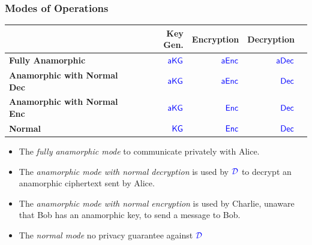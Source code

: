 \documentclass[]{beamer}
\newcommand{\calD}{\mathcal{D}}    %
\newcommand{\algofont}[1]{{\mathsf{#1}}}
\newcommand{\kg}{\algofont{KG}}
\newcommand{\enc}{\algofont{Enc}}
\newcommand{\dec}{\algofont{Dec}}
\newcommand{\akg}{\algofont{a}\kg}
\newcommand{\aenc}{\algofont{a}\enc}
\newcommand{\adec}{\algofont{a}\dec}
\begin{document}
\begin{frame}
\frametitle{Modes of Operations}

{\color{brown}
    \begin{tabular}{|l|r|r|r|r|}
    \hline
     &  {\color{red} Key Gen. } 
     & {\color{red}  Encryption} 
     & {\color{red} Decryption}\\ \hline
{\bf Fully Anamorphic}&  $\color{blue} \akg$ & $\color{blue} \aenc$ & $\color{blue} \adec$ \\ \hline
{\bf Anamorphic with Normal Dec}& $\color{blue} \akg$ & $\color{blue} \aenc$ & $\color{blue} \dec$              \\ \hline
{\bf Anamorphic with Normal Enc} & $\color{blue} \akg$ & $\color{blue} \enc$ & $\color{blue} \dec$            \\ \hline
{\bf Normal} &  $\color{blue} \kg$   &  $\color{blue} \enc$ & $\color{blue} \dec$  \\ \hline
    \end{tabular}
}

\begin{itemize}
\item The {\color{brown} {\em fully anamorphic mode}} 
to communicate privately with Alice.
\item The {\color{brown} {\em anamorphic mode with normal decryption}}
is used by $\color{blue}\calD$ to decrypt an anamorphic ciphertext sent by Alice.
\item The {\color{brown}\em anamorphic mode with normal encryption} is used by Charlie,
unaware that Bob has an anamorphic key, to send a message to Bob.
\item The {\color{brown} \em normal mode} 
no privacy guarantee against $\color{blue}\calD$
\end{itemize}
       


\end{frame}
\end{document}
